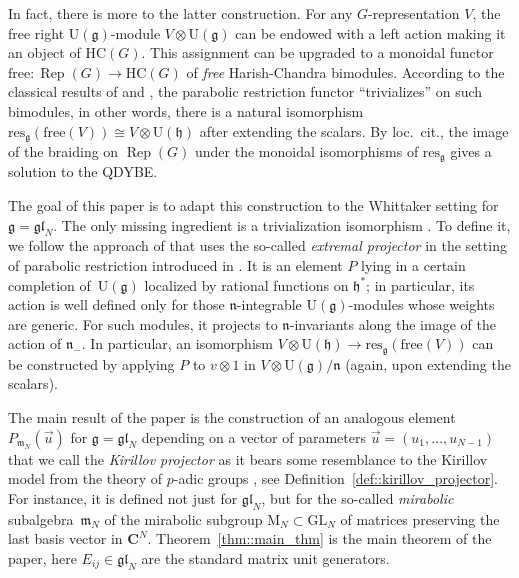 \documentclass[pdftex]{sigma}
\numberwithin{equation}{section}
\newcommand{\C}{\mathbf{C}}
\newcommand{\Z}{\mathbf{Z}}
\newcommand{\GL}{\mathrm{GL}}
\newcommand{\g}{\mathfrak{g}}
\newcommand{\h}{\mathfrak{h}}
\newcommand{\n}{\mathfrak{n}}
\newcommand{\m}{\mathfrak{m}}
\newcommand{\free}{\mathrm{free}}
\DeclareMathOperator{\Rep}{Rep}
\newcommand{\res}{\mathrm{res}}
\newcommand{\gl}{\mathfrak{gl}}
\begin{document}
	In fact, there is more to the latter construction. For any $G$-representation $V$, the free right $\mathrm{U}(\g)$-module $V \otimes \mathrm{U}(\g)$ can be endowed with a left action making it an object of $\mathrm{HC}(G)$. This assignment can be upgraded to a monoidal functor $\free \colon \Rep(G) \rightarrow \mathrm{HC}(G)$ of \emph{free} Harish-Chandra bimodules. According to the classical results of \cite{ZhelobenkoSalgebras} and \cite{EtingofVarchenkoExchange}, the parabolic restriction functor ``trivializes'' on such bimodules, in other words, there is a natural isomorphism~${\res_{\g}(\free(V)) \cong V \otimes \mathrm{U}(\h)}$ after extending the scalars. By loc.\ cit., the image of the braiding on $\Rep(G)$ under the monoidal isomorphisms of $\res_{\g}$ gives a solution to the QDYBE.
	
	The goal of this paper is to adapt this construction to the Whittaker setting for $\g=\gl_N$. The only missing ingredient is a trivialization isomorphism \smash{$\res_{\gl_N}^{\psi}(\free(V)) \cong V \otimes \Z_{\gl_N}$}. To define it, we follow the approach of \cite{ZhelobenkoSalgebras} that uses the so-called \emph{extremal projector} in the setting of parabolic restriction introduced in \cite{AsherovaSmirnovTolstoy}. It is an element $P$ lying in a certain completion of~$\mathrm{U}(\g)$ localized by rational functions on $\h^*$; in particular, its action is well defined only for those $\n$-integrable $\mathrm{U}(\g)$-modules whose weights are generic. For such modules, it projects to $\n$-invariants along the image of the action of $\n_-$. In particular, an isomorphism $V \otimes \mathrm{U}(\h) \rightarrow \res_{\g}(\free(V))$ can be constructed by applying $P$ to $v\otimes 1$ in $V \otimes \mathrm{U}(\g)/\n$ (again, upon extending the scalars).
	
	The main result of the paper is the construction of an analogous element $P_{\m_N}(\vec{u})$ for $\g=\gl_N$ depending on a vector of parameters $\vec{u}=(u_1,\dots,u_{N-1})$ that we call the \emph{Kirillov projector} as it bears some resemblance to the Kirillov model from the theory of $p$-adic groups \cite{Kirillov}, see Definition~\ref{def::kirillov_projector}. For instance, it is defined not just for $\gl_N$, but for the so-called \emph{mirabolic} subalgebra~$\m_N$ of the mirabolic subgroup $\mathrm{M}_N \subset \GL_N$ of matrices preserving the last basis vector in $\C^N$. Theorem~\ref{thm::main_thm} is the main theorem of the paper, here $E_{ij} \in \gl_N$ are the standard matrix unit generators.
	
\end{document}
